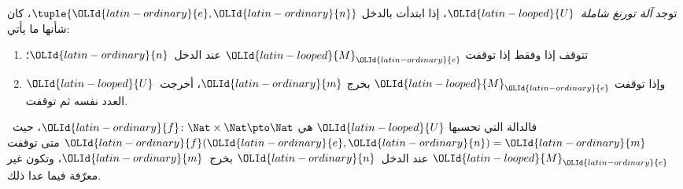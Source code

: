\documentclass[../../../include/open-logic-section]{subfiles}
\begin{document}
\begin{thm}
توجد \emph{آلة تورنغ شاملة}~$\OLId{latin-looped}{U}$، إذا ابتدأت بالدخل $\tuple{\OLId{latin-ordinary}{e},\OLId{latin-ordinary}{n}}$،
كان شأنها ما يأتي:
  \begin{enumerate}
    \item تتوقف إذا وفقط إذا توقفت $\OLId{latin-looped}{M}_\OLId{latin-ordinary}{e}$ عند الدخل~$\OLId{latin-ordinary}{n}$؛
    \item وإذا توقفت $\OLId{latin-looped}{M}_\OLId{latin-ordinary}{e}$ بخرج $\OLId{latin-ordinary}{m}$، أخرجت~$\OLId{latin-looped}{U}$ العدد نفسه ثم توقفت.
  \end{enumerate}
  فالدالة التي تحسبها $\OLId{latin-looped}{U}$ هي $\OLId{latin-ordinary}{f}\colon\Nat\times\Nat\pto\Nat$،
  حيث~$\OLId{latin-ordinary}{f}(\OLId{latin-ordinary}{e},\OLId{latin-ordinary}{n})=\OLId{latin-ordinary}{m}$ متى توقفت $\OLId{latin-looped}{M}_\OLId{latin-ordinary}{e}$ عند الدخل~$\OLId{latin-ordinary}{n}$ بخرج~$\OLId{latin-ordinary}{m}$،
  وتكون غير معرّفة فيما عدا ذلك.
\end{thm}
\end{document}
